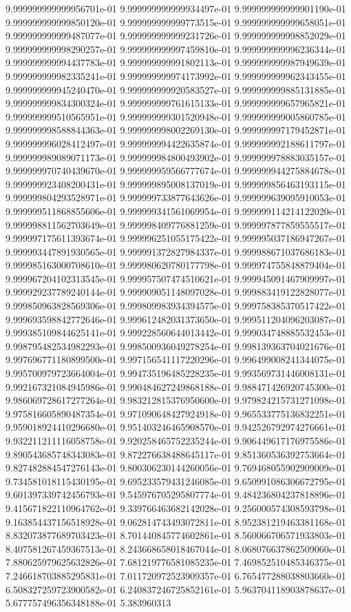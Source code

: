 9.999999999999956701e-01	9.999999999999934497e-01	9.999999999999901190e-01	9.999999999999850120e-01	9.999999999999773515e-01	9.999999999999658051e-01	9.999999999999487077e-01	9.999999999999231726e-01	9.999999999998852029e-01	9.999999999998290257e-01	9.999999999997459810e-01	9.999999999996236344e-01	9.999999999994437783e-01	9.999999999991802113e-01	9.999999999987949639e-01	9.999999999982335241e-01	9.999999999974173992e-01	9.999999999962343455e-01	9.999999999945240470e-01	9.999999999920583527e-01	9.999999999885131885e-01	9.999999999834300324e-01	9.999999999761615133e-01	9.999999999657965821e-01	9.999999999510565951e-01	9.999999999301520948e-01	9.999999999005860785e-01	9.999999998588844363e-01	9.999999998002269130e-01	9.999999997179452871e-01	9.999999996028412497e-01	9.999999994422635874e-01	9.999999992188611797e-01	9.999999989089071173e-01	9.999999984800493902e-01	9.999999978883035157e-01	9.999999970740439670e-01	9.999999959566777674e-01	9.999999944275884678e-01	9.999999923408200431e-01	9.999999895008137019e-01	9.999999856463193115e-01	9.999999804293528971e-01	9.999999733877643626e-01	9.999999639095910053e-01	9.999999511868855606e-01	9.999999341561069954e-01	9.999999114214122020e-01	9.999998811562703649e-01	9.999998409776881259e-01	9.999997877859555517e-01	9.999997175611393674e-01	9.999996251055175422e-01	9.999995037186947267e-01	9.999993447891930565e-01	9.999991372827984337e-01	9.999988671037686183e-01	9.999985163000708610e-01	9.999980620780177798e-01	9.999974755848879404e-01	9.999967204102313545e-01	9.999957507474510621e-01	9.999945091467909997e-01	9.999929237789240144e-01	9.999909051148097028e-01	9.999883419122828077e-01	9.999850963828569306e-01	9.999809983934394575e-01	9.999758385370517422e-01	9.999693598842772646e-01	9.999612482031373650e-01	9.999511204096203087e-01	9.999385109844625141e-01	9.999228560644013442e-01	9.999034748885532453e-01	9.998795482534982293e-01	9.998500936049278254e-01	9.998139363704021676e-01	9.997696771180899500e-01	9.997156541117220296e-01	9.996499008241344075e-01	9.995700979723664004e-01	9.994735196485228235e-01	9.993569731446008131e-01	9.992167321084945986e-01	9.990484627249868188e-01	9.988471426920745300e-01	9.986069728617277264e-01	9.983212815376950600e-01	9.979824215731271098e-01	9.975816605890487354e-01	9.971090648427924918e-01	9.965533775136832251e-01	9.959018924410296680e-01	9.951403246465908570e-01	9.942526792974276661e-01	9.932211211116058758e-01	9.920258465752235244e-01	9.906449617176975586e-01	9.890543685748343083e-01	9.872276638488645117e-01	9.851360536392753664e-01	9.827482884547276143e-01	9.800306230144260056e-01	9.769468055902909009e-01	9.734581018115430195e-01	9.695233579431246085e-01	9.650991086306672795e-01	9.601397339742456793e-01	9.545976705295807774e-01	9.484236804237818896e-01	9.415671822110964762e-01	9.339766463682142028e-01	9.256000574308593798e-01	9.163854437156518928e-01	9.062814743493072811e-01	8.952381219463381168e-01	8.832073877689703423e-01	8.701440845774602861e-01	8.560066706571933803e-01	8.407581267459367513e-01	8.243668658018467044e-01	8.068076637862509060e-01	7.880625979625632826e-01	7.681219776581085235e-01	7.469852510485346375e-01	7.246618703885295831e-01	7.011720972523909357e-01	6.765477288038803660e-01	6.508327259723900582e-01	6.240837246725852161e-01	5.963704118903878637e-01	5.677757496356348188e-01	5.383960313